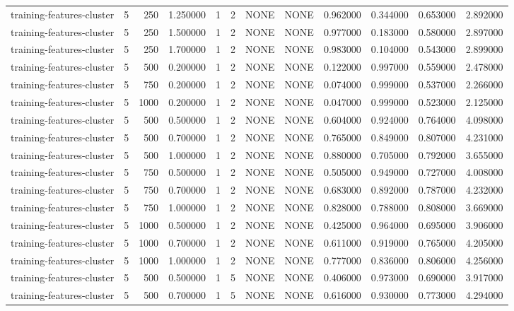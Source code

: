 \begin{tabular}{lrrrllllrrrr}
training-features-cluster & 5 & 250 & 1.250000 & 1 & 2 & NONE & NONE & 0.962000 & 0.344000 & 0.653000 & 2.892000 \\
training-features-cluster & 5 & 250 & 1.500000 & 1 & 2 & NONE & NONE & 0.977000 & 0.183000 & 0.580000 & 2.897000 \\
training-features-cluster & 5 & 250 & 1.700000 & 1 & 2 & NONE & NONE & 0.983000 & 0.104000 & 0.543000 & 2.899000 \\
training-features-cluster & 5 & 500 & 0.200000 & 1 & 2 & NONE & NONE & 0.122000 & 0.997000 & 0.559000 & 2.478000 \\
training-features-cluster & 5 & 750 & 0.200000 & 1 & 2 & NONE & NONE & 0.074000 & 0.999000 & 0.537000 & 2.266000 \\
training-features-cluster & 5 & 1000 & 0.200000 & 1 & 2 & NONE & NONE & 0.047000 & 0.999000 & 0.523000 & 2.125000 \\
training-features-cluster & 5 & 500 & 0.500000 & 1 & 2 & NONE & NONE & 0.604000 & 0.924000 & 0.764000 & 4.098000 \\
training-features-cluster & 5 & 500 & 0.700000 & 1 & 2 & NONE & NONE & 0.765000 & 0.849000 & 0.807000 & 4.231000 \\
training-features-cluster & 5 & 500 & 1.000000 & 1 & 2 & NONE & NONE & 0.880000 & 0.705000 & 0.792000 & 3.655000 \\
training-features-cluster & 5 & 750 & 0.500000 & 1 & 2 & NONE & NONE & 0.505000 & 0.949000 & 0.727000 & 4.008000 \\
training-features-cluster & 5 & 750 & 0.700000 & 1 & 2 & NONE & NONE & 0.683000 & 0.892000 & 0.787000 & 4.232000 \\
training-features-cluster & 5 & 750 & 1.000000 & 1 & 2 & NONE & NONE & 0.828000 & 0.788000 & 0.808000 & 3.669000 \\
training-features-cluster & 5 & 1000 & 0.500000 & 1 & 2 & NONE & NONE & 0.425000 & 0.964000 & 0.695000 & 3.906000 \\
training-features-cluster & 5 & 1000 & 0.700000 & 1 & 2 & NONE & NONE & 0.611000 & 0.919000 & 0.765000 & 4.205000 \\
training-features-cluster & 5 & 1000 & 1.000000 & 1 & 2 & NONE & NONE & 0.777000 & 0.836000 & 0.806000 & 4.256000 \\
training-features-cluster & 5 & 500 & 0.500000 & 1 & 5 & NONE & NONE & 0.406000 & 0.973000 & 0.690000 & 3.917000 \\
training-features-cluster & 5 & 500 & 0.700000 & 1 & 5 & NONE & NONE & 0.616000 & 0.930000 & 0.773000 & 4.294000 \\

\end{tabular}
